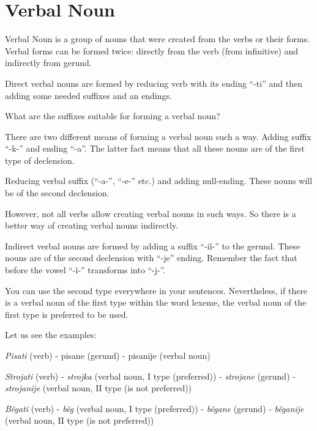 \section{Verbal Noun}

Verbal Noun is a group of nouns that were created from the verbs or their forms. Verbal forms can be formed twice: directly from the verb (from infinitive) and indirectly from gerund.

Direct verbal nouns are formed by reducing verb with its ending “-ti” and then adding some needed suffixes and an endings.

What are the suffixes suitable for forming a verbal noun? 

There are two different means of forming a verbal noun such a way.
Adding suffix “-k-” and ending “-a”. The latter fact means that all these nouns are of the first type of declension. 

Reducing verbal suffix (“-a-”,  “-e-” etc.) and adding null-ending. These nouns will be of the second declension.

However, not all verbs allow creating verbal nouns in such ways. So there is a better way of creating verbal nouns indirectly.

Indirect verbal nouns are formed by adding a suffix “-iǐ-” to the gerund. These nouns are of the second declension with “-je” ending. Remember the fact that before the vowel “-ǐ-” transforms into “-j-”. 

You can use the second type everywhere in your sentences. Nevertheless, if there is a verbal noun of the first type within the word lexeme, the verbal noun of the first type is preferred to be used.

Let us see the examples:

\textit{Pisati} (verb) - pisane (gerund) - pisanije (verbal noun)

\textit{Strojati} (verb) - \textit{strojka} (verbal noun, I type (preferred)) - \textit{strojane} (gerund) - \textit{strojanije} (verbal noun, II type (is not preferred))

\textit{Běgati} (verb) - \textit{běg} (verbal noun, I type (preferred)) - \textit{běgane} (gerund) - \textit{běganije} (verbal noun, II type (is not preferred))  

